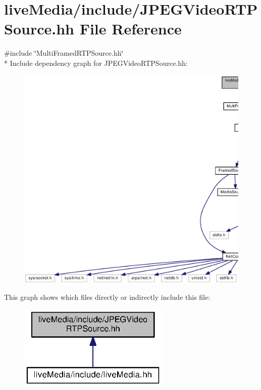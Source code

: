\section{live\+Media/include/\+J\+P\+E\+G\+Video\+R\+T\+P\+Source.hh File Reference}
\label{JPEGVideoRTPSource_8hh}
{\ttfamily \#include \char`\"{}Multi\+Framed\+R\+T\+P\+Source.\+hh\char`\"{}}\\*
Include dependency graph for J\+P\+E\+G\+Video\+R\+T\+P\+Source.\+hh\+:
\nopagebreak
\begin{figure}[H]
\begin{center}
\leavevmode
\includegraphics[width=350pt]{JPEGVideoRTPSource_8hh__incl}
\end{center}
\end{figure}
This graph shows which files directly or indirectly include this file\+:
\nopagebreak
\begin{figure}[H]
\begin{center}
\leavevmode
\includegraphics[width=204pt]{JPEGVideoRTPSource_8hh__dep__incl}
\end{center}
\end{figure}
